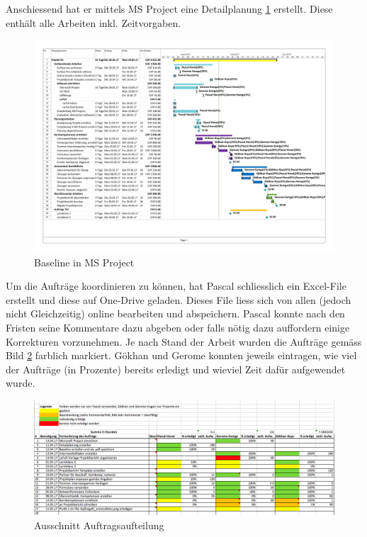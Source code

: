 Anschiessend hat er mittels MS Project eine Detailplanung \ref{fig:msproject} erstellt. Diese enthält alle Arbeiten inkl. Zeitvorgaben.

\begin{figure}[ht]
	\centering
	\includegraphics[width=1.6\textwidth, angle =270]{images/BaselineAC2.pdf}
	\caption{Baseline in MS Project}
	\label{fig:msproject}
\end{figure}

Um die Aufträge koordinieren zu können, hat Pascal schliesslich ein Excel-File erstellt und diese auf One-Drive geladen. Dieses File liess sich von allen (jedoch nicht Gleichzeitig) online bearbeiten und abspeichern. Pascal konnte nach den Fristen seine Kommentare dazu abgeben oder falls nötig dazu auffordern einige Korrekturen vorzunehmen. Je nach Stand der Arbeit wurden die Aufträge gemäss Bild \ref{fig:auftrage} farblich markiert. Gökhan und Gerome konnten jeweils eintragen, wie viel der Aufträge (in Prozente) bereits erledigt und wieviel Zeit dafür aufgewendet wurde. 

\begin{figure}[ht]
	\centering
	\includegraphics[width=1\textwidth]{images/Auftrage}
	\caption{Ausschnitt Auftragsaufteilung}
	\label{fig:auftrage}
\end{figure}

